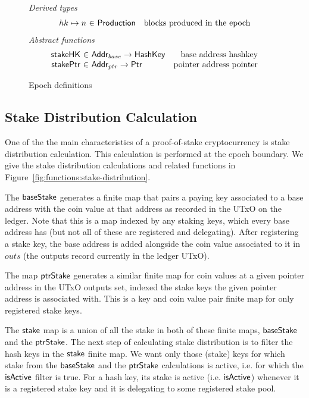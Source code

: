 \begin{figure}[htb]
  \emph{Derived types}
  \begin{equation*}
    \begin{array}{r@{~\in~}lr}
      hk \mapsto n & \Production & \text{blocks produced in the epoch}
    \end{array}
  \end{equation*}
  \emph{Abstract functions}
  \begin{equation*}
    \begin{array}{r@{~\in~}lr}
      \fun{stakeHK} & \Addr_{base} \to \HashKey
      & \text{base address hashkey}\\
      \fun{stakePtr} & \Addr_{ptr} \to \Ptr
      & \text{pointer address pointer}\\
    \end{array}
  \end{equation*}
  \caption{Epoch definitions}
  \label{fig:epoch-defs}
\end{figure}

\subsection{Stake Distribution Calculation}
\label{sec:stake-dist}

One of the the main characteristics of a proof-of-stake cryptocurrency is stake
distribution calculation. This calculation is performed at the epoch boundary.
We give the stake distribution calculations and related functions in
Figure~\ref{fig:functions:stake-distribution}.

The $\mathsf{baseStake}$ generates a finite map that pairs a paying key
associated to a base address with the coin value at that address as recorded
in the UTxO on the ledger. Note that this is a map indexed by any staking keys,
which every base address has (but not all of these are registered and delegating).
After registering a stake key, the base address is added alongside the
coin value associated to it in $outs$ (the outputs record currently in the
ledger UTxO).

The map
$\mathsf{ptrStake}$ generates a similar finite map for coin values at a given
pointer address in the UTxO outputs set, indexed the stake keys the given
pointer address is associated with.
This is a key and coin value pair finite map for only registered stake keys.

The $\mathsf{stake}$ map is a union of all the stake in both of these finite
maps, $\mathsf{baseStake}$ and the $\mathsf{ptrStake}$.
The next step of calculating stake distribution is to filter the hash keys in
the $\mathsf{stake}$ finite map.
We want only those (stake) keys for which stake
from the $\mathsf{baseStake}$ and the $\mathsf{ptrStake}$ calculations is active, i.e.
for which the $\mathsf{isActive}$ filter is true.
For a hash key, its stake is active (i.e. $\mathsf{isActive}$) whenever it is a
registered stake key
and it is delegating to some registered stake pool.

